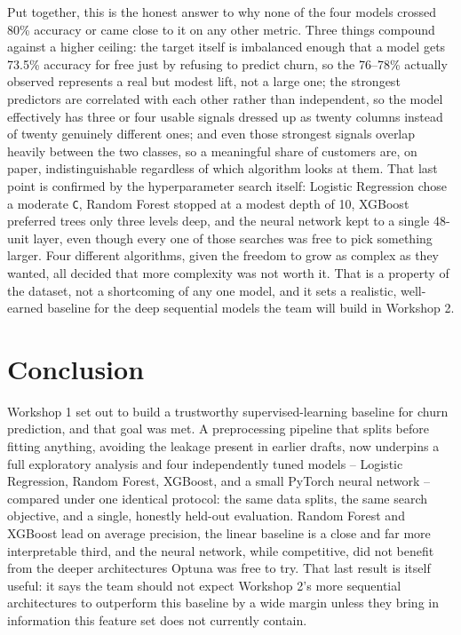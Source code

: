 \documentclass{article}
\begin{document}
Put together, this is the honest answer to why none of the four models crossed 80\% accuracy or came close to it on any other metric. Three things compound against a higher ceiling: the target itself is imbalanced enough that a model gets 73.5\% accuracy for free just by refusing to predict churn, so the 76--78\% actually observed represents a real but modest lift, not a large one; the strongest predictors are correlated with each other rather than independent, so the model effectively has three or four usable signals dressed up as twenty columns instead of twenty genuinely different ones; and even those strongest signals overlap heavily between the two classes, so a meaningful share of customers are, on paper, indistinguishable regardless of which algorithm looks at them. That last point is confirmed by the hyperparameter search itself: Logistic Regression chose a moderate \texttt{C}, Random Forest stopped at a modest depth of 10, XGBoost preferred trees only three levels deep, and the neural network kept to a single 48-unit layer, even though every one of those searches was free to pick something larger. Four different algorithms, given the freedom to grow as complex as they wanted, all decided that more complexity was not worth it. That is a property of the dataset, not a shortcoming of any one model, and it sets a realistic, well-earned baseline for the deep sequential models the team will build in Workshop 2.

\section{Conclusion}
Workshop 1 set out to build a trustworthy supervised-learning baseline for churn prediction, and that goal was met. A preprocessing pipeline that splits before fitting anything, avoiding the leakage present in earlier drafts, now underpins a full exploratory analysis and four independently tuned models -- Logistic Regression, Random Forest, XGBoost, and a small PyTorch neural network -- compared under one identical protocol: the same data splits, the same search objective, and a single, honestly held-out evaluation. Random Forest and XGBoost lead on average precision, the linear baseline is a close and far more interpretable third, and the neural network, while competitive, did not benefit from the deeper architectures Optuna was free to try. That last result is itself useful: it says the team should not expect Workshop 2's more sequential architectures to outperform this baseline by a wide margin unless they bring in information this feature set does not currently contain.
\end{document}
